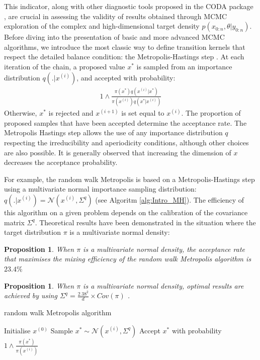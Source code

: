 \documentclass[a4paper,11pt,titlepage]{article}
\theoremstyle{plain} %
\newtheorem{prop}[theo]{Proposition}
\begin{document}
This indicator, along with other diagnostic tools proposed in the CODA package \citep{Plummer2006}, are crucial in assessing the validity of results obtained through MCMC exploration of the complex and high-dimensional target density $p(x_{0:n},\theta|y_{0:n})$. Before diving into the presentation of basic and more advanced MCMC algorithms, we introduce the most classic way to define transition kernels that respect the detailed balance condition: the Metropolis-Hastings step \citep{Metropolis1953,Hastings1970}. At each iteration of the chain, a proposed value $x^*$ is sampled from an importance distribution $q(.|x^{(i)})$, and accepted with probability:
\begin{align}
	1\wedge \frac{\pi(x^*)q(x^{(i)}|x^*)}{\pi(x^{(i)})q(x^*|x^{(i)})}
\end{align}
Otherwise, $x^*$ is rejected and $x^{(i+1)}$ is set equal to $x^{(i)}$. The proportion of proposed samples that have been accepted determine the acceptance rate.  The Metropolis Hastings step allows the use of any importance distribution $q$ respecting the irreducibility and aperiodicity conditions, although other choices are also possible. It is generally observed that increasing the dimension of $x$ decreases the acceptance probability. 


For example, the random walk Metropolis is  based  on a Metropolis-Hastings step using a multivariate normal importance sampling distribution: $q(.|x^{(i)})=\mathcal{N}(x^{(i)},\Sigma^q)$ (see Algoritm \ref{alg:Intro_MH}). The efficiency of this algorithm on a given problem depends on the calibration of the covariance matrix $\Sigma^q$.
Theoretical results have been demonstrated in the situation where the target  distribution $\pi$  is  a multivariate normal density:

\begin{prop}
	When $\pi$ is  a multivariate normal density, the acceptance rate that maximises the mixing efficiency of the random walk Metropolis algorithm is $23.4\%$ \citep{Roberts1997}
\end{prop}

\begin{prop}
	When $\pi$ is  a multivariate normal density, optimal results are achieved by using $\Sigma^q = \frac{2.38^2}{d}\times Cov(\pi)$ \citep{Roberts1997}.
\end{prop}

\begin{algorithm}[h]
\caption{random walk Metropolis algorithm}
\label{alg:Intro_MH}
{\fontsize{12}{20}\selectfont
\begin{algorithmic}
\STATE Initialise $x^{(0)}$
	\STATE Sample $x^*\sim \mathcal{N}(x^{(i)}, \Sigma^q)$
	\STATE Accept $x^*$ with probability $1\wedge\frac{\pi(x^*)}{\pi(x^{(i)})}$
\ENDFOR
\end{algorithmic}
}
\end{algorithm}
\end{document}
